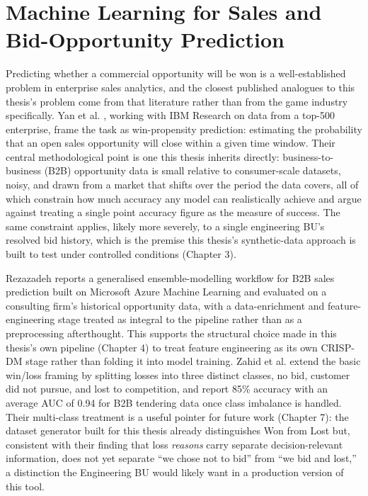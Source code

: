 \documentclass[12pt,oneside]{report}
\begin{document}
\hypertarget{machine-learning-for-sales-and-bid-opportunity-prediction}{%
\section{Machine Learning for Sales and Bid-Opportunity
Prediction}\label{machine-learning-for-sales-and-bid-opportunity-prediction}}

Predicting whether a commercial opportunity will be won is a
well-established problem in enterprise sales analytics, and the closest
published analogues to this thesis's problem come from that literature
rather than from the game industry specifically. Yan et al.
\citep{yan2015sales}, working with IBM Research on data from a top-500
enterprise, frame the task as win-propensity prediction: estimating the
probability that an open sales opportunity will close within a given
time window. Their central methodological point is one this thesis
inherits directly: business-to-business (B2B) opportunity data is small
relative to consumer-scale datasets, noisy, and drawn from a market that
shifts over the period the data covers, all of which constrain how much
accuracy any model can realistically achieve and argue against treating
a single point accuracy figure as the measure of success. The same
constraint applies, likely more severely, to a single engineering BU's
resolved bid history, which is the premise this thesis's synthetic-data
approach is built to test under controlled conditions (Chapter 3).

Rezazadeh \citep{rezazadeh2020generalized} reports a generalised
ensemble-modelling workflow for B2B sales prediction built on Microsoft
Azure Machine Learning and evaluated on a consulting firm's historical
opportunity data, with a data-enrichment and feature-engineering stage
treated as integral to the pipeline rather than as a preprocessing
afterthought. This supports the structural choice made in this thesis's
own pipeline (Chapter 4) to treat feature engineering as its own
CRISP-DM stage rather than folding it into model training. Zahid et al.
\citep{zahid2021predicting} extend the basic win/loss framing by
splitting losses into three distinct classes, no bid, customer did not
pursue, and lost to competition, and report 85\% accuracy with an
average AUC of 0.94 for B2B tendering data once class imbalance is
handled. Their multi-class treatment is a useful pointer for future work
(Chapter 7): the dataset generator built for this thesis already
distinguishes Won from Lost but, consistent with their finding that loss
\emph{reasons} carry separate decision-relevant information, does not
yet separate ``we chose not to bid'' from ``we bid and lost,'' a
distinction the Engineering BU would likely want in a production version
of this tool.
\end{document}
